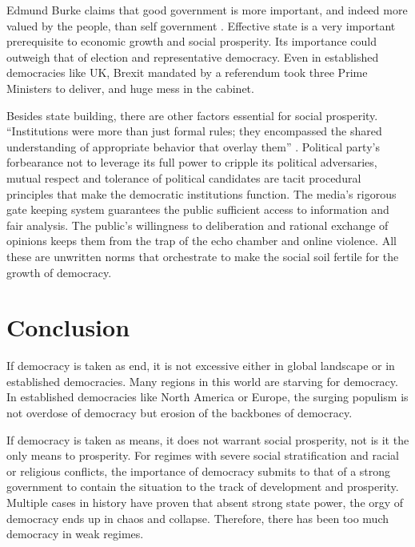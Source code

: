 \documentclass{scrartcl}
\begin{document}
Edmund Burke claims that good government is more important, and indeed
more valued by the people, than self government \autocite[70]{scand}.
Effective state is a very important prerequisite to economic growth
and social prosperity. Its importance could outweigh that of election
and representative democracy. 
Even in established democracies like UK,
Brexit mandated by a referendum took three Prime Ministers to deliver,
and huge mess in the cabinet.

Besides state building, there are other factors essential for social
prosperity. ``Institutions were more than just formal rules; they
encompassed the shared understanding of appropriate behavior that
overlay them'' \autocite[213]{demdie}. Political party's forbearance
not to leverage its full power to cripple its political adversaries,
mutual respect and tolerance of political candidates are tacit procedural
principles that make the democratic institutions function. The media's
rigorous gate keeping system guarantees the public sufficient access
to information and fair analysis. The public's willingness to deliberation
and rational exchange of opinions keeps them from the trap of the
echo chamber and online violence. All these are unwritten norms that
orchestrate to make the social soil fertile for the growth of democracy.

\bigskip{}


\section{Conclusion}

If democracy is taken as end, it is not excessive either in global
landscape or in established democracies. Many regions in this world
are starving for democracy. In established democracies like North
America or Europe, the surging populism is not overdose of democracy
but erosion of the backbones of democracy. 

If democracy is taken as means, it does not warrant social prosperity,
not is it the only means to prosperity. For regimes with severe social
stratification and racial or religious conflicts, the importance of
democracy submits to that of a strong government to contain the situation
to the track of development and prosperity. Multiple cases in history
have proven that absent strong state power, the orgy of democracy
ends up in chaos and collapse. Therefore, there has been too much
democracy in weak regimes. 
\end{document}
